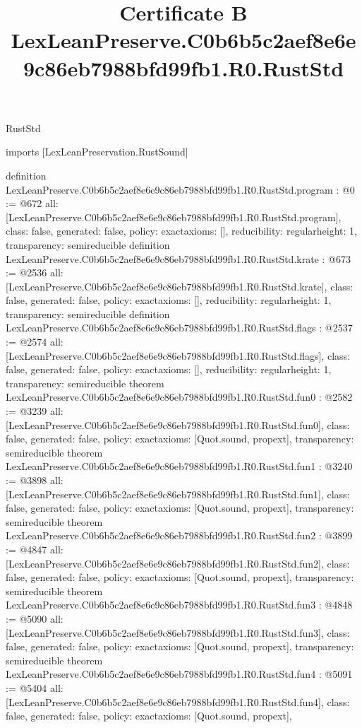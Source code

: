\begin{lexlean}{RustStd}
\title{Certificate B LexLeanPreserve.C0b6b5c2aef8e6e9c86eb7988bfd99fb1.R0.RustStd}
\begin{coremodule}
imports [LexLeanPreservation.RustSound]

definition LexLeanPreserve.C0b6b5c2aef8e6e9c86eb7988bfd99fb1.R0.RustStd.program : @0 := @672 {
  all: [LexLeanPreserve.C0b6b5c2aef8e6e9c86eb7988bfd99fb1.R0.RustStd.program],
  class: false,
  generated: false,
  policy: exact{axioms: []},
  reducibility: regular{height: 1},
  transparency: semireducible
}
definition LexLeanPreserve.C0b6b5c2aef8e6e9c86eb7988bfd99fb1.R0.RustStd.krate : @673 := @2536 {
  all: [LexLeanPreserve.C0b6b5c2aef8e6e9c86eb7988bfd99fb1.R0.RustStd.krate],
  class: false,
  generated: false,
  policy: exact{axioms: []},
  reducibility: regular{height: 1},
  transparency: semireducible
}
definition LexLeanPreserve.C0b6b5c2aef8e6e9c86eb7988bfd99fb1.R0.RustStd.flags : @2537 := @2574 {
  all: [LexLeanPreserve.C0b6b5c2aef8e6e9c86eb7988bfd99fb1.R0.RustStd.flags],
  class: false,
  generated: false,
  policy: exact{axioms: []},
  reducibility: regular{height: 1},
  transparency: semireducible
}
theorem LexLeanPreserve.C0b6b5c2aef8e6e9c86eb7988bfd99fb1.R0.RustStd.fun0 : @2582 := @3239 {
  all: [LexLeanPreserve.C0b6b5c2aef8e6e9c86eb7988bfd99fb1.R0.RustStd.fun0],
  class: false,
  generated: false,
  policy: exact{axioms: [Quot.sound, propext]},
  transparency: semireducible
}
theorem LexLeanPreserve.C0b6b5c2aef8e6e9c86eb7988bfd99fb1.R0.RustStd.fun1 : @3240 := @3898 {
  all: [LexLeanPreserve.C0b6b5c2aef8e6e9c86eb7988bfd99fb1.R0.RustStd.fun1],
  class: false,
  generated: false,
  policy: exact{axioms: [Quot.sound, propext]},
  transparency: semireducible
}
theorem LexLeanPreserve.C0b6b5c2aef8e6e9c86eb7988bfd99fb1.R0.RustStd.fun2 : @3899 := @4847 {
  all: [LexLeanPreserve.C0b6b5c2aef8e6e9c86eb7988bfd99fb1.R0.RustStd.fun2],
  class: false,
  generated: false,
  policy: exact{axioms: [Quot.sound, propext]},
  transparency: semireducible
}
theorem LexLeanPreserve.C0b6b5c2aef8e6e9c86eb7988bfd99fb1.R0.RustStd.fun3 : @4848 := @5090 {
  all: [LexLeanPreserve.C0b6b5c2aef8e6e9c86eb7988bfd99fb1.R0.RustStd.fun3],
  class: false,
  generated: false,
  policy: exact{axioms: [Quot.sound, propext]},
  transparency: semireducible
}
theorem LexLeanPreserve.C0b6b5c2aef8e6e9c86eb7988bfd99fb1.R0.RustStd.fun4 : @5091 := @5404 {
  all: [LexLeanPreserve.C0b6b5c2aef8e6e9c86eb7988bfd99fb1.R0.RustStd.fun4],
  class: false,
  generated: false,
  policy: exact{axioms: [Quot.sound, propext]},
}
\end{coremodule}
\end{lexlean}
